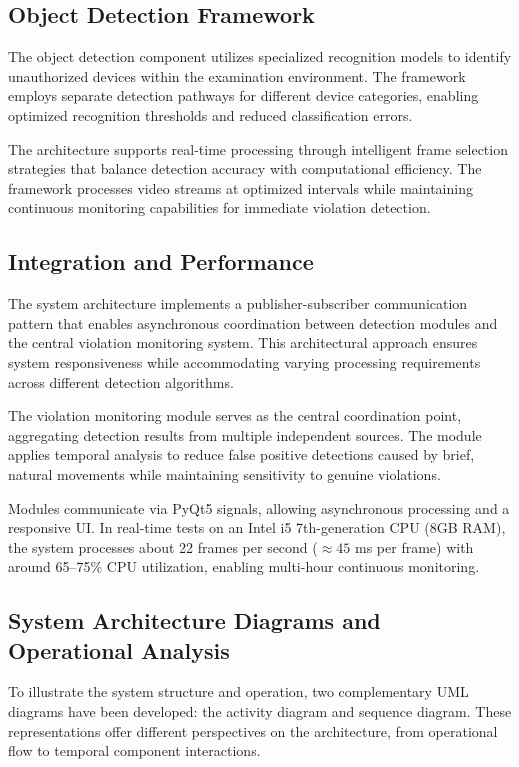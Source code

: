 \documentclass[conference]{IEEEtran}
\begin{document}
\subsection{Object Detection Framework}

The object detection component utilizes specialized recognition models to identify 
unauthorized devices within the examination environment. The framework employs separate 
detection pathways for different device categories, enabling optimized recognition 
thresholds and reduced classification errors.

The architecture supports real-time processing through intelligent frame selection 
strategies that balance detection accuracy with computational efficiency. The framework 
processes video streams at optimized intervals while maintaining continuous monitoring 
capabilities for immediate violation detection.

\subsection{Integration and Performance}

The system architecture implements a publisher-subscriber communication pattern that 
enables asynchronous coordination between detection modules and the central violation 
monitoring system. This architectural approach ensures system responsiveness while 
accommodating varying processing requirements across different detection algorithms.

The violation monitoring module serves as the central coordination point, aggregating 
detection results from multiple independent sources. The module applies temporal analysis 
to reduce false positive detections caused by brief, natural movements while maintaining 
sensitivity to genuine violations.

Modules communicate via PyQt5 signals, allowing asynchronous 
processing and a responsive UI. In real-time tests 
on an Intel i5 7th-generation CPU (8GB RAM), the system processes about 
22 frames per second ($\approx45$ ms per frame) with around 65–75\% CPU utilization, 
enabling multi-hour continuous monitoring.

\subsection{System Architecture Diagrams and Operational Analysis}

To illustrate the system structure and operation, two complementary UML diagrams have 
been developed: the activity diagram and sequence diagram. These representations offer 
different perspectives on the architecture, from operational flow to temporal component 
interactions.
\end{document}
